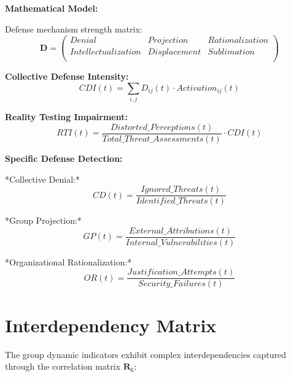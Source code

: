 \documentclass[11pt,a4paper]{article}
\begin{document}
\textbf{Mathematical Model:}

Defense mechanism strength matrix:
\begin{equation}
\mathbf{D} = \begin{pmatrix}
Denial & Projection & Rationalization \\
Intellectualization & Displacement & Sublimation \\
\end{pmatrix}
\end{equation}

\textbf{Collective Defense Intensity:}
\begin{equation}
CDI(t) = \sum_{i,j} D_{ij}(t) \cdot Activation_{ij}(t)
\end{equation}

\textbf{Reality Testing Impairment:}
\begin{equation}
RTI(t) = \frac{Distorted\_Perceptions(t)}{Total\_Threat\_Assessments(t)} \cdot CDI(t)
\end{equation}

\textbf{Specific Defense Detection:}

*Collective Denial:*
\begin{equation}
CD(t) = \frac{Ignored\_Threats(t)}{Identified\_Threats(t)}
\end{equation}

*Group Projection:*
\begin{equation}
GP(t) = \frac{External\_Attributions(t)}{Internal\_Vulnerabilities(t)}
\end{equation}

*Organizational Rationalization:*
\begin{equation}
OR(t) = \frac{Justification\_Attempts(t)}{Security\_Failures(t)}
\end{equation}

\section{Interdependency Matrix}

The group dynamic indicators exhibit complex interdependencies captured through the correlation matrix $\mathbf{R}_{6}$:
\end{document}
